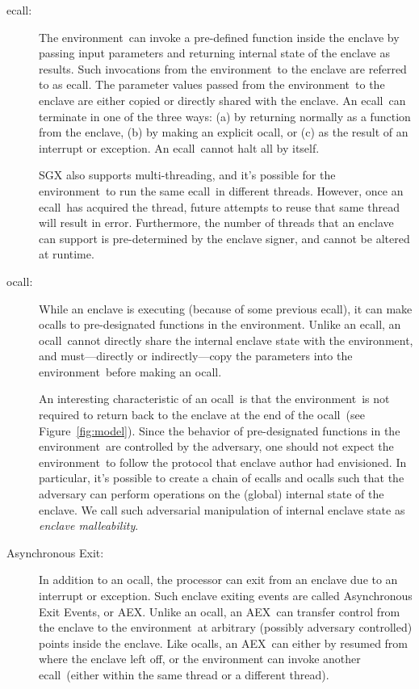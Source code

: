 \documentclass[letterpaper]{article}
\newcommand{\ecall}{\textsf{ecall}}
\newcommand{\ocall}{\textsf{ocall}}
\newcommand{\aex}{\textsf{AEX}}
\newcommand{\env}{\textsf{environment}}
\begin{document}
  \begin{description}
  \item[\ecall:] The \env\ can invoke a pre-defined function inside
    the enclave by passing input parameters and returning internal
    state of the enclave as results. Such invocations from the
    \env\ to the enclave are referred to as \ecall. The parameter
    values passed from the \env\ to the enclave are either copied or
    directly shared with the enclave. An \ecall\ can terminate in one
    of the three ways: (a) by returning normally as a function from
    the enclave, (b) by making an explicit \ocall, or (c) as the
    result of an interrupt or exception. An \ecall\ cannot halt all by
    itself.

    SGX also supports multi-threading, and it's possible for the
    \env\ to run the same \ecall\ in different threads. However, once
    an \ecall\ has acquired the thread, future attempts to reuse that
    same thread will result in error. Furthermore, the number of
    threads that an enclave can support is pre-determined by the
    enclave signer, and cannot be altered at runtime.

  \item [\ocall:] While an enclave is executing (because of some
    previous \ecall), it can make \ocall s to pre-designated functions
    in the \env.  Unlike an \ecall, an \ocall\ cannot directly share
    the internal enclave state with the \env, and must---directly or
    indirectly---copy the parameters into the \env\ before making an
    \ocall.

    An interesting characteristic of an \ocall\ is that the \env\ is
    not required to return back to the enclave at the end of the
    \ocall\ (see Figure~\ref{fig:model}). Since the behavior of
    pre-designated functions in the \env\ are controlled by the
    adversary, one should not expect the \env\ to follow the protocol
    that enclave author had envisioned. In particular, it's possible
    to create a chain of \ecall s and \ocall s such that the adversary
    can perform operations on the (global) internal state of the
    enclave. We call such adversarial manipulation of internal enclave
    state as \textit{enclave malleability}.

  \item[\textsf{Asynchronous Exit}:] In addition to an \ocall, the
    processor can exit from an enclave due to an interrupt or
    exception. Such enclave exiting events are called
    \textsf{Asynchronous Exit Events}, or \aex. Unlike an \ocall, an
    \aex\ can transfer control from the enclave to the \env\ at
    arbitrary (possibly adversary controlled) points inside the
    enclave. Like \ocall s, an \aex\ can either by resumed from where
    the enclave left off, or the environment can invoke another
    \ecall\ (either within the same thread or a different thread).


\end{description}
\end{document}
